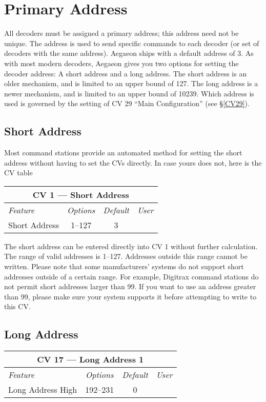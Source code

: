 \documentclass[12pt,letterpaper,draft]{memoir} %
\begin{document}
\section{Primary Address}
\label{PrimaryAddress}
All decoders must be assigned a primary address; this address need not be unique. The address is used to send specific commands to each decoder (or set of decoders with the same address). Aegaeon ships with a default address of 3. As with most modern decoders, Aegaeon gives you two options for setting the decoder address: A short address and a long address. The short address is an older mechanism, and is limited to an upper bound of 127. The long address is a newer mechanism, and is limited to an upper bound of 10239. Which address is used is governed by the setting of CV 29 ``Main Configuration'' (see \S\ref{CV29}).

\subsection{Short Address}
\label{CV1}
Most command stations provide an automated method for setting the short address without having to set the CVs directly. In case yours does not, here is the CV table
\begin{center}
\begin{tabular}{|l|c|c|c|}
\hline
\multicolumn{4}{|c|}{\textbf{CV 1 --- Short Address}} \\ \hline \hline
\textit{Feature} & \textit{Options} & \textit{Default} & \textit{User} \\ \hline
Short Address& 1--127 & 3 &\\ \hline
\end{tabular}
\end{center}

The short address can be entered directly into CV 1 without further calculation. The range of valid addresses is 1--127. Addresses outside this range cannot be written. Please note that some manufacturers' systems do not support short addresses outside of a certain range. For example, Digitrax command stations do not permit short addresses larger than 99. If you want to use an address greater than 99, please make sure your system supports it before attempting to write to this CV.

\subsection{Long Address}
\label{CV17}
\begin{center}
\begin{tabular}{|l|c|c|c|}
\hline
\multicolumn{4}{|c|}{\textbf{CV 17 --- Long Address 1}} \\ \hline \hline
\textit{Feature} & \textit{Options} & \textit{Default} & \textit{User} \\ \hline
Long Address High & 192--231 & 0 &\\ \hline
\end{tabular}
\end{center}
\end{document}
